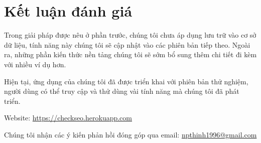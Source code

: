 \chapter{Kết luận đánh giá}
Trong giải pháp được nêu ở phần trước, chúng tôi chưa áp dụng lưu trữ vào cơ sở dữ liệu, tính năng này chúng tôi sẽ cập nhật vào các phiên bản tiếp theo. Ngoài ra, những phần kiến thức nền tảng chúng tôi sẽ sớm bổ sung thêm chi tiết đi kèm với nhiều ví dụ hơn.
\\\par
Hiện tại, ứng dụng của chúng tôi đã được triển khai với phiên bản thử nghiệm, người dùng có thể truy cập và thử dùng vài tính năng mà chúng tôi đã phát triển.
\\\par
Website: \url{https://checkseo.herokuapp.com}
\\\par
Chúng tôi nhận các ý kiến phản hồi đóng góp qua email: \href{mailto:npthinh1996@gmail.com}{npthinh1996@gmail.com}